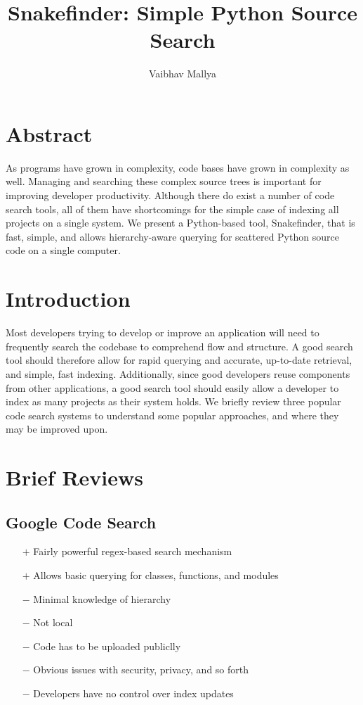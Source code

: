 \documentclass{article}
\begin{document}
\title{Snakefinder: Simple Python Source Search}
\author{Vaibhav Mallya}
\maketitle

\section{Abstract}

As programs have grown in complexity, code bases have grown in complexity as well. Managing and searching these complex source trees is important for improving developer productivity. Although there do exist a number of code search tools, all of them have shortcomings for the simple case of indexing all projects on a single system. We present a Python-based tool, Snakefinder, that is fast, simple, and allows hierarchy-aware querying for scattered Python source code on a single computer.

\section{Introduction}
Most developers trying to develop or improve an application will need to frequently search the codebase to comprehend flow and structure. A good search tool should therefore allow for rapid querying and accurate, up-to-date retrieval, and simple, fast indexing. Additionally, since good developers reuse components from other applications, a good search tool should easily allow a developer to index as many projects as their system holds. We briefly review three popular code search systems to understand some popular approaches, and where they may be improved upon.


\section{Brief Reviews}
\subsection{Google Code Search}
	\begin{itemize}
    \item[$+$] Fairly powerful regex-based search mechanism
    \item[$+$] Allows basic querying for classes, functions, and modules

    \item[$-$] Minimal knowledge of hierarchy    
	\item[$-$] Not local  
    \item[$-$] Code has to be uploaded publiclly
    \item[$-$] Obvious issues with security, privacy, and so forth
    \item[$-$] Developers have no control over index updates
	\end{itemize}
	
\end{document}
